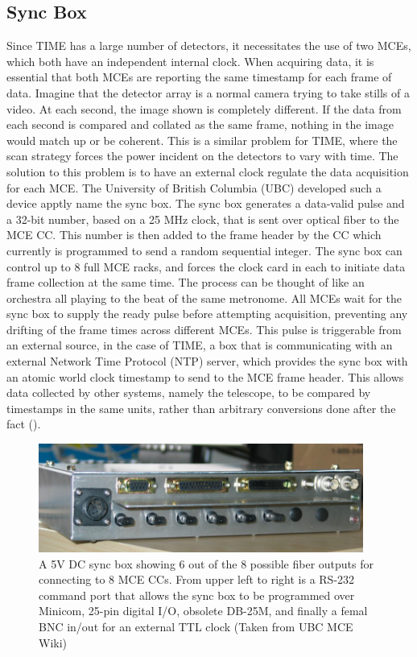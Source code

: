 \documentclass[manuscript]{aastex}
\begin{document}
\subsection{\textbf{Sync Box}}
Since TIME has a large number of detectors, it necessitates the use of two MCEs, which both have an independent internal clock. When acquiring data, it is essential that both MCEs are reporting the same timestamp for each frame of data. Imagine that the detector array is a normal camera trying to take stills of a video. At each second, the image shown is completely different. If the data from each second is compared and collated as the same frame, nothing in the image would match up or be coherent. This is a similar problem for TIME, where the scan strategy forces the power incident on the detectors to vary with time. The solution to this problem is to have an external clock regulate the data acquisition for each MCE. The University of British Columbia (UBC) developed such a device apptly name the sync box. 
The sync box generates a data-valid pulse and a 32-bit number, based on a 25 MHz clock, that is sent over optical fiber to the MCE CC. This number is then added to the frame header by the CC which currently is programmed to send a random sequential integer. The sync box can control up to 8 full MCE racks, and forces the clock card in each to initiate data frame collection at the same time. The process can be thought of like an orchestra all playing to the beat of the same metronome. All MCEs wait for the sync box to supply the ready pulse before attempting acquisition, preventing any drifting of the frame times across different MCEs. This pulse is triggerable from an external source, in the case of TIME, a box that is communicating with an external Network Time Protocol (NTP) server, which provides the sync box with an atomic world clock timestamp to send to the MCE frame header. This allows data collected by other systems, namely the telescope, to be compared by timestamps in the same units, rather than arbitrary conversions done after the fact (\cite{Battistelli2008}).

\begin{figure}[H]
\centering
\captionsetup{width=0.95\textwidth}
\includegraphics[width=0.95\textwidth]{sync.png}
\caption[University of British Columbia Sync Box]{A 5V DC sync box showing 6 out of the 8 possible fiber outputs for connecting to 8 MCE CCs. From upper left to right is a RS-232 command port that allows the sync box to be programmed over {\sc Minicom}, 25-pin digital I/O, obsolete DB-25M, and finally a femal BNC in/out for an external TTL clock (Taken from UBC MCE Wiki)}
\label{fig:mce}
\vspace{-0.8cm}
\end{figure}
\end{document}
